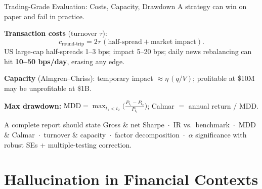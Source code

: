 \documentclass[9pt,t]{beamer}
\begin{document}
\begin{frame}{Trading-Grade Evaluation: Costs, Capacity, Drawdown}
A strategy can win on paper and fail in practice.

\smallskip
\begin{underhood}
\textbf{Transaction costs} (turnover $\tau$):
\[
  c_{\text{round-trip}} = 2\tau\,(\text{half-spread} + \text{market impact}).
\]
US large-cap half-spreads 1--3 bps; impact 5--20 bps; daily news rebalancing
can hit \textbf{10--50 bps/day}, erasing any edge.

\smallskip
\textbf{Capacity} (Almgren--Chriss): temporary impact $\approx \eta\,(q/V)$;
profitable at \$10M may be unprofitable at \$1B.

\smallskip
\textbf{Max drawdown:}
$\text{MDD} = \max_{t_1<t_2}\!\bigl(\frac{P_{t_1}-P_{t_2}}{P_{t_1}}\bigr)$;
Calmar $=$ annual return / MDD.
\end{underhood}

\smallskip
\begin{block}{A complete report should state}
Gross \& net Sharpe \,$\cdot$\, IR vs.\ benchmark \,$\cdot$\, MDD \& Calmar
\,$\cdot$\, turnover \& capacity \,$\cdot$\, factor decomposition \,$\cdot$\,
$\alpha$ significance with robust SEs + multiple-testing correction.
\end{block}
\end{frame}

\section{Hallucination in Financial Contexts}
\end{document}
